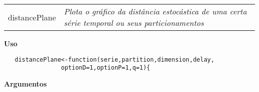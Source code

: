 \documentclass[12pt,letterpaper]{article}
\begin{document}
\newpage

\hrulefill   

\begin{table}[!h]
\begin{center}
\begin{tabularx}{\textwidth}{ X X}
\hspace{0.5cm} distancePlane & \textit{Plota o gráfico da distância estocástica de uma certa série temporal ou seus particionamentos}\\
\end{tabularx}
\end{center}
\end{table} 

\vspace{-0.5cm}

\hrulefill  

\vspace{0.5cm}

\textbf{Uso}

\begin{lstlisting}
   distancePlane<-function(serie,partition,dimension,delay,
   				optionD=1,optionP=1,q=1){
\end{lstlisting}

\vspace{0.5cm}

\textbf{Argumentos}
\end{document}
